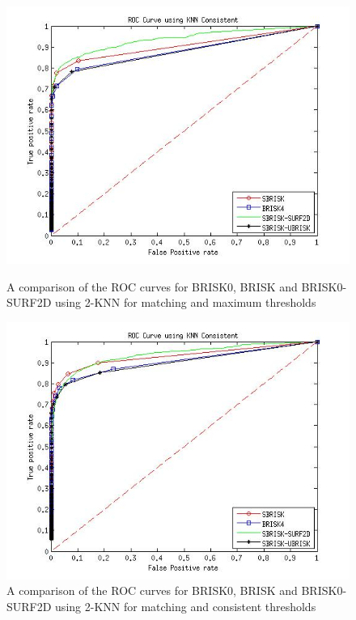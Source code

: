 \documentclass{article}
\begin{document}
\begin{figure}[h!]
\begin{minipage}[b]{0.5\linewidth}
\label{fig:compareKNNConsistent}
\end{minipage}
\begin{minipage}[b]{0.5\linewidth}
\includegraphics[scale=0.5]{../Drawings/ROC_General_KNN.jpg}
\caption{A comparison of the ROC curves for BRISK0, BRISK and BRISK0-SURF2D using 2-KNN for matching and maximum thresholds}
\label{fig:compareKNN}
\end{minipage}
\begin{minipage}[b]{0.5\linewidth}
\includegraphics[scale=0.5]{../Drawings/ROC_General_KNN_Consistent.jpg}
\caption{A comparison of the ROC curves for BRISK0, BRISK and BRISK0-SURF2D using 2-KNN for matching and consistent thresholds}
\label{fig:compareKNNConsistent}
\end{minipage}
\end{figure}
\end{document}
